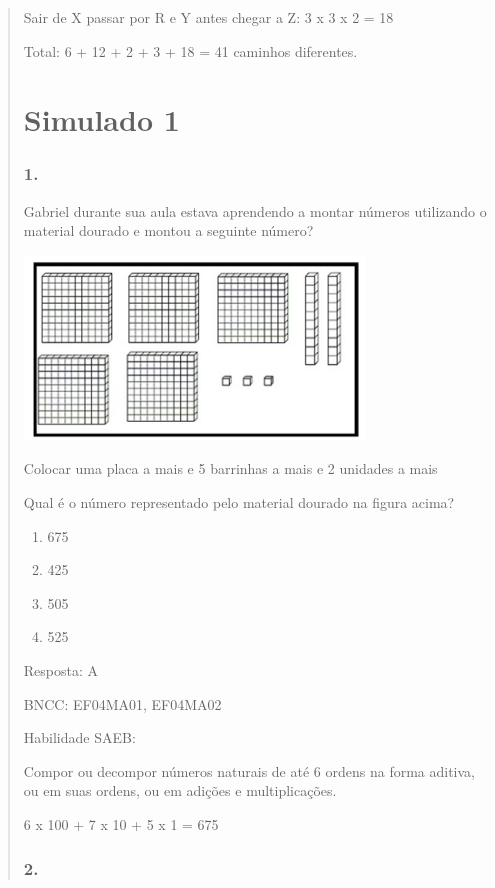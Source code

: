 \begin{enumerate}
\begin{escolha}
\begin{enumerate}
\begin{itemize}
\begin{itemize}
\begin{escolha}
\begin{quote}
\begin{escolha}
{Sair de X passar por R e Y antes chegar a Z: 3 x 3 x 2 = 18

Total: 6 + 12 + 2 + 3 + 18 = 41 caminhos diferentes.

\section{Simulado 1}\label{simulado-1}

\subsubsection{1.}\label{section-143}

Gabriel durante sua aula estava aprendendo a montar números utilizando o
material dourado e montou a seguinte número?

\includegraphics[width=3.55128in,height=1.93600in]{media/image142.png}

Colocar uma placa a mais e 5 barrinhas a mais e 2 unidades a mais

Qual é o número representado pelo material dourado na figura acima?

\begin{enumerate}
\def\labelenumi{\alph{enumi})}
\item
  675
\item
  425
\item
  505
\item
  525
\end{enumerate}

Resposta: A

BNCC: EF04MA01, EF04MA02

Habilidade SAEB:

Compor ou decompor números naturais de até 6 ordens na forma aditiva, ou
em suas ordens, ou em adições e multiplicações.

6 x 100 + 7 x 10 + 5 x 1 = 675

\subsubsection{2.}\label{section-144}

}
\end{escolha}
\end{quote}
\end{escolha}
\end{itemize}
\end{itemize}
\end{enumerate}
\end{escolha}
\end{enumerate}
